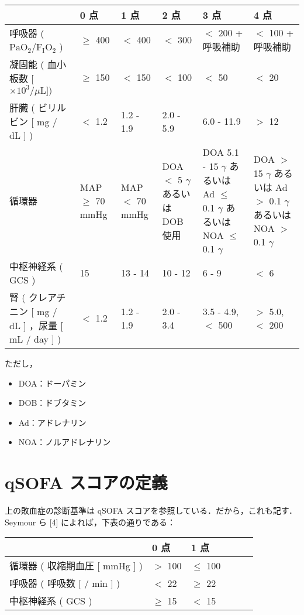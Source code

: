 \documentclass[10pt,uplatex]{jsarticle}
\begin{document}
\begin{table}[htb]

\begin{tabular}{|p{3.5cm}|p{2.5cm}|p{2.5cm}|p{2.5cm}|p{2.5cm}|p{2.5cm}|}  \hline
 & 0 点 & 1 点 & 2 点 & 3 点 & 4 点 \\  \hline
呼吸器 ( $\mathrm{PaO}_2 / \mathrm{F_IO_2}$ ) & $\geq$ 400 & $<$ 400 & $<$ 300 & $<$ 200 + 呼吸補助 & $<$ 100 + 呼吸補助 \\  \hline
凝固能 ( 血小板数 [ $\times 10^3 / \mu \mathrm{L} ])$ & $\geq$ 150 & $<$ 150 & $<$ 100 & $<$ 50 & $<$ 20 \\  \hline
肝臓 ( ビリルビン [ mg / dL ] ) & $<$ 1.2 & 1.2 - 1.9 & 2.0 - 5.9 & 6.0 - 11.9 & $>$ 12 \\  \hline
循環器 & 
 MAP $\geq$ 70 mmHg & MAP $<$ 70 mmHg & 
 DOA $<$ 5 $\gamma$ あるいは DOB 使用 &
 DOA 5.1 - 15 $\gamma$ あるいは Ad $\leq$ 0.1 $\gamma$ あるいは NOA $\leq$ 0.1 $\gamma$ &
 DOA $>$ 15 $\gamma$ あるいは Ad $>$ 0.1 $\gamma$ あるいは NOA $>$ 0.1 $\gamma$ \\  \hline
中枢神経系 ( GCS ) & 15 & 13 - 14 & 10 - 12 & 6 - 9 & $<$ 6 \\  \hline
腎 ( クレアチニン [ mg / dL ] ，尿量 [ mL / day ] ) & $<$ 1.2 & 1.2 - 1.9 & 2.0 - 3.4 & 3.5 - 4.9, $<$ 500 & $>$ 5.0, $<$ 200 \\  \hline
\end{tabular}
\end{table}

ただし，

\begin{itemize}
\item DOA：ドーパミン
\item DOB：ドブタミン
\item Ad：アドレナリン
\item NOA：ノルアドレナリン
\end{itemize}

\section{qSOFA スコアの定義}

上の敗血症の診断基準は qSOFA スコアを参照している．だから，これも記す． Seymour ら [4] によれば，下表の通りである：

\begin{table}[htb]
\begin{center}
\begin{tabular}{|p{5cm}|p{2.5cm}|p{2.5cm}|p{2.5cm}|p{2.5cm}|p{2.5cm}|}  \hline
 & 0 点 & 1 点 \\  \hline
循環器 ( 収縮期血圧 [ mmHg ] )& $>$ 100 & $\leq$ 100 \\ \hline
呼吸器 ( 呼吸数 [ / min ] )& $<$ 22 & $\geq$ 22 \\ \hline
中枢神経系 ( GCS ) & $\geq$ 15 & $<$ 15 \\ \hline
\end{tabular}
\end{center}
\end{table}
\end{document}
